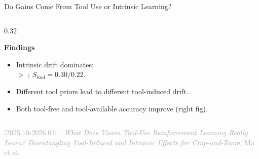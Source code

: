\begin{frame}[label=short-paper3-intrinsic]{\Large Do Gains Come From Tool Use or Intrinsic Learning?}
\begin{columns}[T,onlytextwidth]
\begin{column}{0.32\textwidth}
      \vspace{0.10cm}
      {\fontsize{7.8}{9.4}\selectfont
      \textbf{Findings}
      \begin{itemize}
        \setlength{\itemsep}{0.60em}
        \item Intrinsic drift dominates: \\[0.15em] \intrinsicarea{} $>$ \toolareas{}; $S_{\mathrm{tool}}=0.30/0.22$.
        \item Different tool priors lead to different tool-induced drift.
        \item Both tool-free and tool-available accuracy improve (right fig).
      \end{itemize}
      }
    \end{column}
  \end{columns}

  \begin{flushright}
    \vspace{-0.18cm}
    {\fontsize{5.5}{5}\selectfont \textcolor{darkgray}{[2025.10-2026.01]~~\textit{What Does Vision Tool-Use Reinforcement Learning Really Learn? Disentangling Tool-Induced and Intrinsic Effects for Crop-and-Zoom}, Ma et al.}}
  \end{flushright}
\end{frame}


